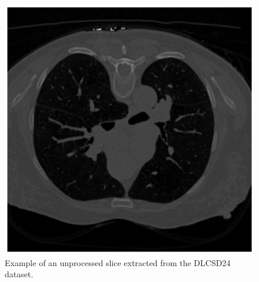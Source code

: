 \begin{figure}[h]
    \centering
    \includegraphics[width=0.6\linewidth]{images/dlcs_sample_unprocessed.png}
    \caption{Example of an unprocessed slice extracted from the DLCSD24 dataset.}
    \label{fig:dlcs-sample-unprocessed}
\end{figure}